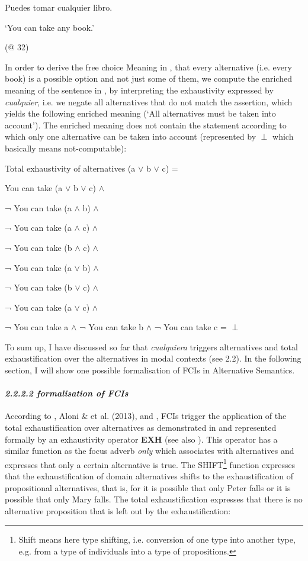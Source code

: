 \documentclass[output=paper]{langscibook}
\begin{document}
\label{bkm:Ref533761676}  Puedes tomar cualquier libro. 

  ‘You can take any book.’

  (@ 32)

In order to derive the free choice Meaning in , that every alternative (i.e. every book) is a possible option and not just some of them, we compute the enriched meaning of the sentence in , by interpreting the exhaustivity expressed by \textit{cualquier}, i.e. we negate all alternatives that do not match the assertion, which yields the following enriched meaning (‘All alternatives must be taken into account’). The enriched meaning does not contain the statement according to which only one alternative can be taken into account (represented by ${\perp}$ which basically means not-computable):

\label{bkm:Ref533761693}  Total exhaustivity of alternatives (a ${\vee}$ b ${\vee}$ c) =

    You can take (a ${\vee}$ b ${\vee}$ c) ${\wedge}$

    ¬ You can take (a ${\wedge}$ b) ${\wedge}$

    ¬ You can take (a ${\wedge}$ c) ${\wedge}$

    ¬ You can take (b ${\wedge}$ c) ${\wedge}$

    ¬ You can take (a ${\vee}$ b) ${\wedge}$

    ¬ You can take (b ${\vee}$ c) ${\wedge}$

    ¬ You can take (a ${\vee}$ c) ${\wedge}$

    ¬ You can take a ${\wedge}$ ¬ You can take b ${\wedge}$ ¬ You can take c = ${\perp}$

To sum up, I have discussed so far that \textit{cualquiera} triggers alternatives and total exhaustification over the alternatives in modal contexts (see 2.2). In the following section, I will show one possible formalisation of FCIs in Alternative Semantics.

\paragraph{\textit{2.2.2.2  formalisation of FCIs}}

According to \citet{Aloni2007}, Aloni \& et al. (2013), and \citet{Aloni2021}, FCIs trigger the application of the total exhaustification over alternatives as demonstrated in  and represented formally by an exhaustivity operator \textbf{EXH} (see also \citealt{Menéndez-Benito2010}). This operator has a similar function as the focus adverb \textit{only} which associates with alternatives and expresses that only a certain alternative is true. The SHIFT\footnote{Shift means here type shifting, i.e. conversion of one type into another type, e.g. from a type of individuals into a type of propositions.}  function expresses that the exhaustification of domain alternatives shifts to the exhaustification of propositional alternatives, that is, for  it is possible that only Peter falls or it is possible that only Mary falls. The total exhaustification expresses that there is no alternative proposition that is left out by the exhaustification:
\end{document}

